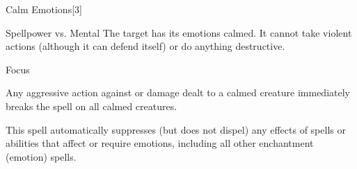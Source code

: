 \begin{spellsection}{Calm Emotions}[3]
    \begin{spellheader}
    \end{spellheader}
    \begin{spellcontent}
        \begin{spelltargetinginfo}
        \end{spelltargetinginfo}
        \begin{spelleffects}
            \begin{spellattack}{Spellpower vs. Mental}
                \spellsuccess The target has its emotions calmed. It cannot take violent actions (although it can defend itself) or do anything destructive.
            \end{spellattack}
            \spelldur Focus
        \end{spelleffects}
    \end{spellcontent}
    \begin{spellfooter}
        \spellnotes Any aggressive action against or damage dealt to a calmed creature immediately breaks the spell on all calmed creatures.

        This spell automatically suppresses (but does not dispel) any effects of spells or abilities that affect or require emotions, including all other enchantment (emotion) spells.
        \miscastyou
    \end{spellfooter}
\end{spellsection}

